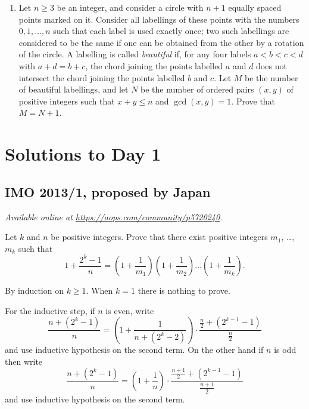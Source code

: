 \documentclass[11pt]{scrartcl}
\begin{document}
\begin{enumerate}[\bfseries 1.]
\item %
Let $n \ge 3$ be an integer, and consider a circle with $n + 1$ equally spaced points marked on it.
Consider all labellings of these points with the numbers
$0, 1, \dots , n$ such that each label is used exactly once;
two such labellings are considered to be the same if
one can be obtained from the other by a rotation of the circle.
A labelling is called \emph{beautiful} if, for any four labels $a < b < c < d$ with $a + d = b + c$,
the chord joining the points labelled $a$ and $d$
does not intersect the chord joining the points labelled $b$ and $c$.
Let $M$ be the number of beautiful labellings,
and let $N$ be the number of ordered pairs $(x, y)$ of positive integers
such that $x + y \le n$ and $\gcd(x, y) = 1$.
Prove that $M = N + 1$.

\end{enumerate}
\pagebreak

\section{Solutions to Day 1}
\subsection{IMO 2013/1, proposed by Japan}
\textsl{Available online at \url{https://aops.com/community/p5720240}.}
\begin{mdframed}[style=mdpurplebox,frametitle={Problem statement}]
Let  $k$ and $n$ be positive integers.
Prove that there exist positive integers $m_1$, \dots, $m_k$
such that
\[ 1 + \frac{2^k-1}{n} = \left( 1 + \frac{1}{m_1} \right) \left( 1 + \frac{1}{m_2} \right)
  \dots \left( 1 + \frac{1}{m_k} \right). \]
\end{mdframed}
By induction on $k \ge 1$.
When $k = 1$ there is nothing to prove.

For the inductive step, if $n$ is even, write
\[
  \frac{n + (2^k-1)}{n}
  = \left( 1 + \frac{1}{n + (2^k-2)} \right) \cdot \frac{\frac n2 + (2^{k-1}-1)}{\frac n2}
\]
and use inductive hypothesis on the second term.
On the other hand if $n$ is odd then write
\[
  \frac{n + (2^k-1)}{n}
  = \left( 1 + \frac{1}{n} \right) \cdot \frac{\frac{n+1}{2} + (2^{k-1}-1)}{\frac{n+1}2}
\]
and use inductive hypothesis on the second term.
\pagebreak
\end{document}
